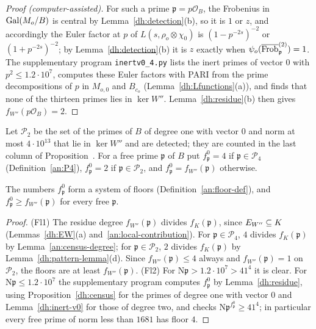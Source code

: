\begin{proof}[Proof (computer-assisted)]
For such a prime $\mathfrak p=p\mathcal O_B$, the Frobenius in
$\operatorname{Gal}(M_o/B)$ is central by Lemma~\ref{dh:detection}(b), so it is $1$ or $z$,
and accordingly the Euler factor at $p$ of $L(s,\rho_o\otimes\chi_0)$ is
$(1-p^{-2s})^{-2}$ or $(1+p^{-2s})^{-2}$; by Lemma~\ref{dh:detection}(b) it
is $z$ exactly when $\psi_o(\overline{\operatorname{Frob}}^{(2)}_{\mathfrak p})=1$. The
supplementary program \texttt{inertv0\_4.py} lists the inert primes of
vector $0$ with $p^2\le1.2\cdot10^7$, computes these Euler factors with PARI
from the prime decompositions of $p$ in $M_{o,0}$ and $B_{c_o}$
(Lemma~\ref{dh:Lfunctions}(a)), and finds that none of the thirteen primes
lies in $\ker W''$. Lemma~\ref{dh:residue}(b) then gives
$f_{W''}(p\mathcal O_B)=2$.
\end{proof}

\begin{definition}\label{dh:floors}
Let $\mathcal P_2$ be the set of the primes of $B$ of degree one with vector $0$
and norm at most $4\cdot10^{13}$ that lie in $\ker W''$ and are detected; they
are counted in the last column of Proposition~. For a free
prime $\mathfrak p$ of $B$ put $f^0_{\mathfrak p}=4$ if
$\mathfrak p\in\mathcal P_4$ (Definition~\ref{an:P4}),
$f^0_{\mathfrak p}=2$ if $\mathfrak p\in\mathcal P_2$, and
$f^0_{\mathfrak p}=f_{W''}(\mathfrak p)$ otherwise.
\end{definition}

\begin{lemma}\label{dh:floors-valid}
The numbers $f^0_{\mathfrak p}$ form a system of floors
(Definition~\ref{an:floor-def}), and $f^0_{\mathfrak p}\ge f_{W''}(\mathfrak
p)$ for every free $\mathfrak p$.
\end{lemma}

\begin{proof}
(Fl1) The residue degree $f_{W''}(\mathfrak p)$ divides $f_K(\mathfrak p)$,
since $E_{W''}\subseteq K$ (Lemmas~\ref{dh:EW}(a) and~\ref{an:local-contribution}).
For $\mathfrak p\in\mathcal P_4$, $4$ divides $f_K(\mathfrak p)$ by
Lemma~\ref{an:census-degree}; for $\mathfrak p\in\mathcal P_2$, $2$ divides
$f_K(\mathfrak p)$ by Lemma~\ref{dh:pattern-lemma}(d). Since
$f_{W''}(\mathfrak p)\le4$ always and $f_{W''}(\mathfrak p)=1$ on
$\mathcal P_2$, the floors are at least $f_{W''}(\mathfrak p)$. (Fl2) For
$\mathrm N\mathfrak p>1.2\cdot10^7>41^4$ it is clear. For
$\mathrm N\mathfrak p\le1.2\cdot10^7$ the supplementary program
 computes $f^0_{\mathfrak p}$ by
Lemma~\ref{dh:residue}, using Proposition~\ref{dh:census} for the primes of
degree one with vector $0$ and Lemma~\ref{dh:inert-v0} for those of degree
two, and checks $\mathrm N\mathfrak p^{f^0_{\mathfrak p}}\ge41^4$; in
particular every free prime of norm less than $1681$ has floor $4$.
\end{proof}


